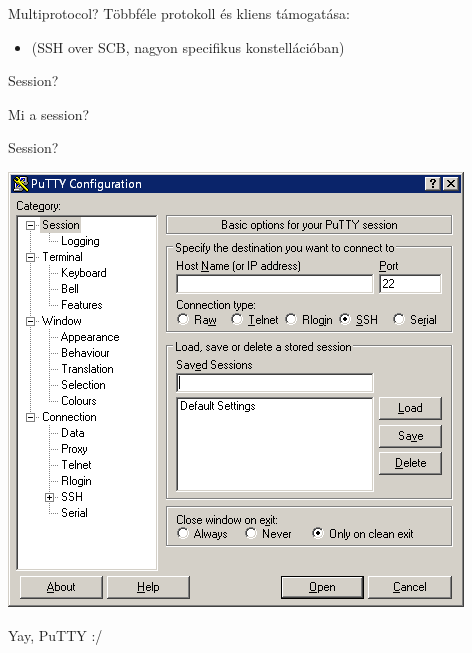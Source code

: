 \documentclass[aspectratio=169]{beamer}
\begin{document}
\begin{frame}{Multiprotocol?}
	Többféle protokoll és kliens támogatása:
	\pause
		\begin{itemize}
	\pause
	\pause
{}
	\pause
{}
	\pause
{}
	\pause
{}
	\pause
{}
	\pause
{}
	\pause
			\item (SSH over SCB, nagyon specifikus konstellációban)
		\end{itemize}
\end{frame}

\begin{frame}{Session?}
		\begin{center}
		Mi a session?
		 \end{center}
\end{frame}

\begin{frame}{Session?}
			\begin{center}

				 \includegraphics[scale=0.4]{putty.png}
		\pause

		Yay, PuTTY :/

			 \end{center}
\end{frame}
\end{document}
